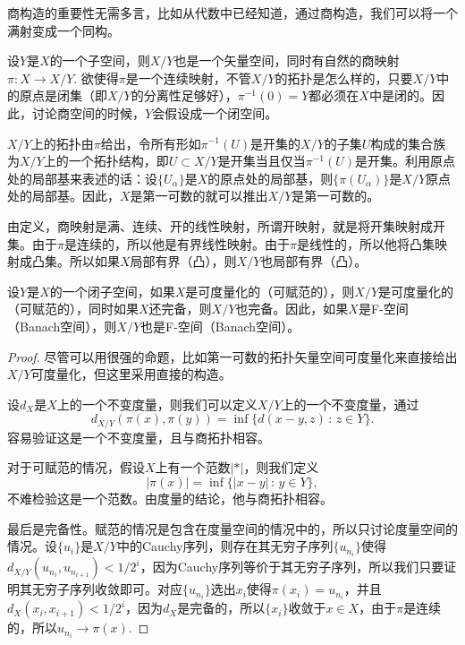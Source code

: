 \begin{para}
	商构造的重要性无需多言，比如从代数中已经知道，通过商构造，我们可以将一个满射变成一个同构。

	设$Y$是$X$的一个子空间，则$X/Y$也是一个矢量空间，同时有自然的商映射$\pi:X\to X/Y$. 欲使得$\pi$是一个连续映射，不管$X/Y$的拓扑是怎么样的，只要$X/Y$中的原点是闭集（即$X/Y$的分离性足够好），$\pi^{-1}(0)=Y$都必须在$X$中是闭的。因此，讨论商空间的时候，$Y$会假设成一个闭空间。

	$X/Y$上的拓扑由$\pi$给出，令所有形如$\pi^{-1}(U)$是开集的$X/Y$的子集$U$构成的集合族为$X/Y$上的一个拓扑结构，即$U\subset X/Y$是开集当且仅当$\pi^{-1}(U)$是开集。利用原点处的局部基来表述的话：设$\{U_\alpha\}$是$X$的原点处的局部基，则$\{\pi(U_\alpha)\}$是$X/Y$原点处的局部基。因此，$X$是第一可数的就可以推出$X/Y$是第一可数的。

	由定义，商映射是满、连续、开的线性映射，所谓开映射，就是将开集映射成开集。由于$\pi$是连续的，所以他是有界线性映射。由于$\pi$是线性的，所以他将凸集映射成凸集。所以如果$X$局部有界（凸），则$X/Y$也局部有界（凸）。
\end{para}

\begin{pro}\label{1.48}
	设$Y$是$X$的一个闭子空间，如果$X$是可度量化的（可赋范的），则$X/Y$是可度量化的（可赋范的），同时如果$X$还完备，则$X/Y$也完备。因此，如果$X$是F-空间（Banach空间），则$X/Y$也是F-空间（Banach空间）。
\end{pro}

\begin{proof}
	尽管可以用很强的命题，比如第一可数的拓扑矢量空间可度量化来直接给出$X/Y$可度量化，但这里采用直接的构造。

	设$d_X$是$X$上的一个不变度量，则我们可以定义$X/Y$上的一个不变度量，通过
	\[
	d_{X/Y}(\pi(x),\pi(y))=\inf\{d(x-y,z)\,:\, z\in Y\}.
	\]
	容易验证这是一个不变度量，且与商拓扑相容。

	对于可赋范的情况，假设$X$上有一个范数$|*|$，则我们定义
	\[
	|\pi(x)|=\inf\{|x-y|\,:\,y\in Y\},
	\]
	不难检验这是一个范数。由度量的结论，他与商拓扑相容。

	最后是完备性。赋范的情况是包含在度量空间的情况中的，所以只讨论度量空间的情况。设$\{u_i\}$是$X/Y$中的Cauchy序列，则存在其无穷子序列$\{u_{n_i}\}$使得$d_{X/Y}(u_{n_i},u_{n_{i+1}})<1/2^i$，因为Cauchy序列等价于其无穷子序列，所以我们只要证明其无穷子序列收敛即可。对应$\{u_{n_i}\}$选出$x_i$使得$\pi(x_i)=u_{n_i}$，并且$d_X(x_i,x_{i+1})<1/2^i$，因为$d_X$是完备的，所以$\{x_i\}$收敛于$x\in X$，由于$\pi$是连续的，所以$u_{n_i}\to \pi(x)$.
\end{proof}

